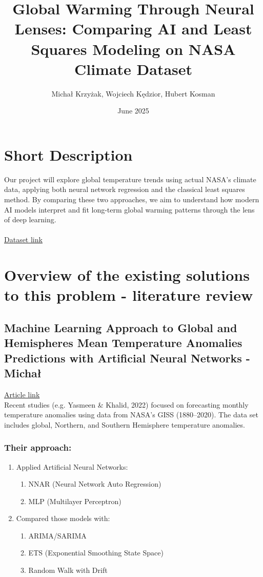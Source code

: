 \documentclass{article}
\title{Global Warming Through Neural Lenses: Comparing AI and Least Squares Modeling on NASA Climate Dataset}
\author{Michał Krzyżak, Wojciech Kędzior, Hubert Kosman}
\date{June 2025}
\begin{document}
\maketitle

\section{Short Description}
\par{
Our project will explore global temperature trends using actual NASA’s climate data, applying both neural network regression and the classical least squares method. By comparing these two approaches, we aim to understand how modern AI models interpret and fit long-term global warming patterns through the lens of deep learning. \\
\\ \href{https://climate.nasa.gov/vital-signs/global-temperature/?intent=121}{Dataset link}

}

\section{Overview of the existing solutions to this problem - literature review}
\subsection{Machine Learning Approach to Global and Hemispheres Mean Temperature Anomalies Predictions with Artificial Neural Networks - Michał}
\par{
\href{https://www.researchgate.net/publication/366567794_Machine_Learning_Approach_to_Global_and_Hemispheres_Mean_Temperature_Anomalies_Predictions_with_Artificial_Neural_Networks_ANNs}{Article link}
\\
Recent studies (e.g. Yasmeen \& Khalid, 2022) focused on forecasting monthly temperature anomalies using data from NASA’s GISS (1880–2020). The data set includes global, Northern, and Southern Hemisphere temperature anomalies.}
\subsubsection*{Their approach:}
\begin{enumerate}
\item Applied Artificial Neural Networks:
\begin{enumerate}
\item NNAR (Neural Network Auto Regression)
\item MLP (Multilayer Perceptron)

\end{enumerate}
\item Compared those models with:
\begin{enumerate}

\item ARIMA/SARIMA
\item ETS (Exponential Smoothing State Space)
\item Random Walk with Drift
\end{enumerate} 
\end{enumerate}
\end{document}
